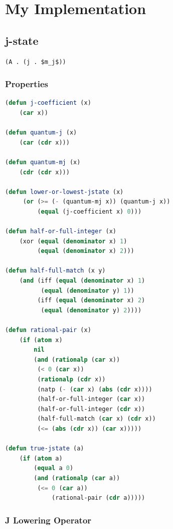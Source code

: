 \documentclass[
paper=128mm:96mm, %
fontsize=11pt, %
pagesize, %
parskip=half-, %
]{scrartcl} %
\theoremstyle{mythmstyle} %
\begin{document}
\section{My Implementation}

\subsection{j-state}

\begin{lstlisting}[language=Lisp,breaklines=true,mathescape]
(A . (j . $m_j$))
\end{lstlisting}

\clearpage

\subsubsection{Properties}

\begin{lstlisting}[language=Lisp,breaklines=true]
(defun j-coefficient (x) 
	(car x))

(defun quantum-j (x)
	(car (cdr x)))

(defun quantum-mj (x)
	(cdr (cdr x)))

(defun lower-or-lowest-jstate (x)
	 (or (>= (- (quantum-mj x)) (quantum-j x))
	     (equal (j-coefficient x) 0)))

(defun half-or-full-integer (x)
	(xor (equal (denominator x) 1)
	     (equal (denominator x) 2)))

(defun half-full-match (x y)
	(and (iff (equal (denominator x) 1)
		  (equal (denominator y) 1))
	     (iff (equal (denominator x) 2)
		  (equal (denominator y) 2))))

(defun rational-pair (x)
	(if (atom x) 
	    nil
	    (and (rationalp (car x))
		 (< 0 (car x))
		 (rationalp (cdr x))
		 (natp (- (car x) (abs (cdr x))))
		 (half-or-full-integer (car x))
		 (half-or-full-integer (cdr x))
		 (half-full-match (car x) (cdr x))
		 (<= (abs (cdr x)) (car x)))))

(defun true-jstate (a)
	(if (atom a)
	    (equal a 0)
	    (and (rationalp (car a))
		 (<= 0 (car a))
	         (rational-pair (cdr a)))))
\end{lstlisting}

\clearpage

\subsubsection{J Lowering Operator}
\end{document}
